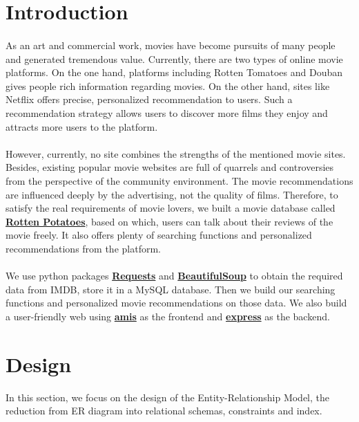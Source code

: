 \begin{CJK*}{UTF8}{gbsn}
\begin{titlepage}
    \vfill
    
\end{titlepage}

\tableofcontents
\pagebreak

\rmfamily
\section{Introduction}
\paragraph{}As an art and commercial work, movies have become pursuits of many people and generated tremendous value. Currently, there are two types of online movie platforms. On the one hand, platforms including Rotten Tomatoes and Douban gives people rich information regarding movies. On the other hand, sites like Netflix offers precise, personalized recommendation to users. Such a recommendation strategy allows users to discover more films they enjoy and attracts more users to the platform.
\paragraph{}However, currently, no site combines the strengths of the mentioned movie sites. Besides, existing popular movie websites are full of quarrels and controversies from the perspective of the community environment. The movie recommendations are influenced deeply by the advertising, not the quality of films. Therefore, to satisfy the real requirements of movie lovers, we built a movie database called \textbf{\href{http://10.20.9.99:3000}{Rotten Potatoes}}, based on which, users can talk about their reviews of the movie freely. It also offers plenty of searching functions and personalized recommendations from the platform. 
\paragraph{}We use python packages \textbf{\href{https://docs.python-requests.org/en/latest/}{Requests}} and \textbf{\href{https://www.crummy.com/software/BeautifulSoup/bs4/doc/}{BeautifulSoup}} to obtain the required data from IMDB, store it in a MySQL database. Then we build our searching functions and personalized movie recommendations on those data. We also build a user-friendly web using \textbf{\href{https://aisuda.bce.baidu.com/amis/zh-CN/docs/index}{amis}} as the frontend and \textbf{\href{https://expressjs.com}{express}} as the backend.
\section{Design}
In this section, we focus on the design of the Entity-Relationship Model, 
the reduction from ER diagram into relational schemas, constraints and index.


\end{CJK*}
